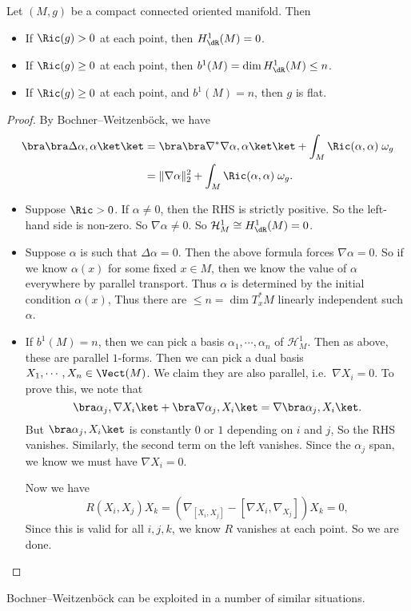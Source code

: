 \documentclass[a4paper]{article}
\begin{document}
\begin{cor}
  Let $(M, g)$ be a compact connected oriented manifold. Then
  \begin{itemize}
    \item If $\Ric(g) > 0$ at each point, then $H_{\dR}^1(M) = 0$.
    \item If $\Ric(g) \geq 0$ at each point, then $b^1(M) = \dim H_{\dR}^1(M) \leq n$.
    \item If $\Ric(g) \geq 0$ at each point, and $b^1(M) = n$, then $g$ is flat.
  \end{itemize}
\end{cor}

\begin{proof}
  By Bochner--Weitzenb\"ock, we have
  \begin{align*}
    \bra \bra \Delta \alpha, \alpha\ket\ket &= \bra \bra \nabla^* \nabla \alpha, \alpha\ket \ket + \int_M \Ric(\alpha, \alpha)\;\omega_g\\
    &= \|\nabla \alpha\|^2_2 + \int_M \Ric(\alpha, \alpha)\;\omega_g.
  \end{align*}

  \begin{itemize}
    \item Suppose $\Ric > 0$. If $\alpha \not= 0$, then the RHS is strictly positive. So the left-hand side is non-zero. So $\nabla \alpha \not =0$. So $\mathcal{H}_M^1 \cong H_{\dR}^1(M) = 0$.

    \item Suppose $\alpha$ is such that $\Delta \alpha = 0$. Then the above formula forces $\nabla \alpha = 0$. So if we know $\alpha(x)$ for some fixed $x \in M$, then we know the value of $\alpha$ everywhere by parallel transport. Thus $\alpha$ is determined by the initial condition $\alpha(x)$, Thus there are $\leq n = \dim T_x^* M$ linearly independent such $\alpha$.

    \item If $b^1(M) = n$, then we can pick a basis $\alpha_1, \cdots, \alpha_n$ of $\mathcal{H}^1_M$. Then as above, these are parallel $1$-forms. Then we can pick a dual basis $X_1, \cdots, X_n \in \Vect(M)$. We claim they are also parallel, i.e.\ $\nabla X_i = 0$. To prove this, we note that
      \[
        \bra \alpha_j, \nabla X_i\ket + \bra \nabla \alpha_j, X_i\ket = \nabla \bra \alpha_j, X_i\ket.
      \]
      But $\bra \alpha_j, X_i\ket$ is constantly $0$ or $1$ depending on $i$ and $j$, So the RHS vanishes. Similarly, the second term on the left vanishes. Since the $\alpha_j$ span, we know we must have $\nabla X_i = 0$.

      Now we have
      \[
        R(X_i, X_j) X_k = (\nabla_{[X_i, X_j]} - [\nabla X_i, \nabla_{X_j}]) X_k = 0,
      \]
      Since this is valid for all $i, j, k$, we know $R$ vanishes at each point. So we are done.\qedhere
  \end{itemize}
\end{proof}
Bochner--Weitzenb\"ock can be exploited in a number of similar situations.
\end{document}
